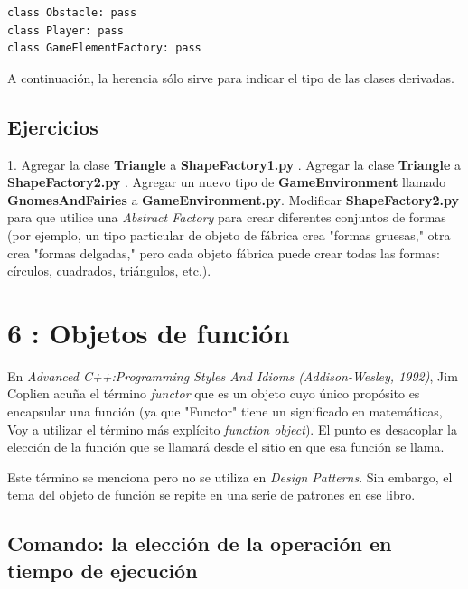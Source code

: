 \documentclass{article}
\begin{document}
\begin{lstlisting} 
class Obstacle: pass 
class Player: pass 
class GameElementFactory: pass 
\end{lstlisting}

A continuación, la herencia sólo sirve  para indicar el tipo de las clases derivadas.   \newline

\subsection{Ejercicios}

1. Agregar la clase \textbf{Triangle} a \textbf{ShapeFactory1.py} . Agregar la clase \textbf{Triangle} a \textbf{ShapeFactory2.py} . Agregar un nuevo tipo de \textbf{GameEnvironment} llamado \textbf{GnomesAndFairies} a \textbf{GameEnvironment.py}. Modificar \textbf{ShapeFactory2.py} para que utilice una \textit{Abstract Factory} para crear diferentes conjuntos de formas (por ejemplo, un tipo particular de objeto de fábrica crea "formas gruesas," otra crea "formas delgadas," pero cada objeto fábrica puede crear todas las formas: círculos, cuadrados, triángulos, etc.).     \newline

\section{6 : Objetos de función}

En \textit{Advanced C++:Programming Styles And Idioms (Addison-Wesley, 1992)},  Jim Coplien acuña el término \textit{functor} que es un objeto cuyo único propósito es encapsular una función (ya que "Functor" tiene un significado en matemáticas, Voy a utilizar el término más explícito  \textit{function object}). El punto es desacoplar la elección de la función que se llamará desde el sitio en que esa función se llama.   \newline

Este término se menciona pero no se utiliza en \textit{Design Patterns}. Sin embargo, el tema del objeto de función se repite en una serie de patrones en ese libro.    \newline

\subsection{Comando: la elección de la operación en tiempo de ejecución}
\end{document}
